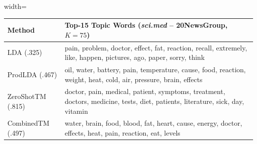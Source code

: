 \begin{table}[t]
    \centering
    \scriptsize
    \setlength{\tabcolsep}{3pt}
    \renewcommand{\arraystretch}{1.2}

    \begin{adjustbox}{width=\linewidth}
    \begin{tabular}{@{}l l@{}}
    \toprule
    \textbf{Method} & \textbf{Top-15 Topic Words (\textit{sci.med} -- 20NewsGroup, $K=75$)} \\
    \midrule
    {\tiny LDA (.325)} & \textcolor{green!90!black}{pain}, \textcolor{green!60!black}{problem}, \textcolor{green!90!black}{doctor}, \textcolor{green!40!black}{effect}, \textcolor{black!70}{fat}, \textcolor{black!40}{reaction}, \textcolor{black!70}{recall}, \textcolor{black!70}{extremely}, \textcolor{green!60!black}{like}, \textcolor{green!40!black}{happen}, \textcolor{black!40}{pictures}, \textcolor{green!40!black}{ago}, \textcolor{black!40}{paper}, \textcolor{green!60!black}{sorry}, \textcolor{green!90!black}{think} \\
    {\tiny ProdLDA (.467)} & \textcolor{black!70}{oil}, \textcolor{green!60!black}{water}, \textcolor{black!70}{battery}, \textcolor{black!40}{pain}, \textcolor{green!40!black}{temperature}, \textcolor{green!40!black}{cause}, \textcolor{green!60!black}{food}, \textcolor{black!70}{reaction}, \textcolor{green!90!black}{weight}, \textcolor{green!60!black}{heat}, \textcolor{green!90!black}{cold}, \textcolor{green!90!black}{air}, \textcolor{green!40!black}{pressure}, \textcolor{black!40}{brain}, \textcolor{black!40}{effects} \\
    {\tiny ZeroShotTM (.815)} & \textcolor{green!90!black}{doctor}, \textcolor{black!70}{pain}, \textcolor{green!60!black}{medical}, \textcolor{green!60!black}{patient}, \textcolor{green!90!black}{symptoms}, \textcolor{green!40!black}{treatment}, \textcolor{green!90!black}{doctors}, \textcolor{green!40!black}{medicine}, \textcolor{black!70}{tests}, \textcolor{green!40!black}{diet}, \textcolor{green!60!black}{patients}, \textcolor{black!40}{literature}, \textcolor{black!40}{sick}, \textcolor{black!40}{day}, \textcolor{black!70}{vitamin} \\
    {\tiny CombinedTM (.497)} & \textcolor{black!70}{water}, \textcolor{black!40}{brain}, \textcolor{green!90!black}{food}, \textcolor{green!90!black}{blood}, \textcolor{black!70}{fat}, \textcolor{black!40}{heart}, \textcolor{green!40!black}{cause}, \textcolor{green!60!black}{energy}, \textcolor{green!90!black}{doctor}, \textcolor{green!40!black}{effects}, \textcolor{black!70}{heat}, \textcolor{green!60!black}{pain}, \textcolor{black!40}{reaction}, \textcolor{green!60!black}{eat}, \textcolor{green!40!black}{levels} \\

\end{tabular}
\end{adjustbox}
\end{table}
